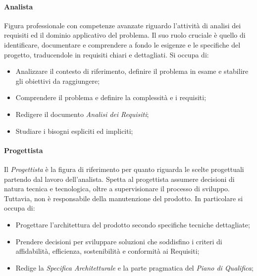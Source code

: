 \documentclass{article}
\begin{document}
        \paragraph{Analista}\label{analista}Figura professionale con competenze avanzate riguardo l'attività di analisi dei requisiti ed il dominio applicativo del problema. Il suo ruolo cruciale è quello di identificare, documentare e comprendere a fondo le esigenze e le specifiche del progetto, traducendole in requisiti chiari e dettagliati. Si occupa di:
        \begin{itemize}
            \item Analizzare il contesto di riferimento, definire il problema in esame e stabilire gli obiettivi da raggiungere;
            \item Comprendere il problema e definire la complessità e i requisiti;
            \item Redigere il documento \textit{Analisi dei Requisiti};
            \item Studiare i bisogni espliciti ed impliciti;
        \end{itemize} 
        \paragraph{Progettista}\label{progettista}Il \textit{Progettista} è la figura di riferimento per quanto riguarda le scelte progettuali partendo dal lavoro dell'analista. Spetta al progettista assumere decisioni di natura tecnica e tecnologica, oltre a supervisionare il processo di sviluppo. Tuttavia, non è responsabile della manutenzione del prodotto. In particolare si occupa di:
        \begin{itemize}
            \item Progettare l'architettura del prodotto secondo specifiche tecniche dettagliate;
            \item Prendere decisioni per sviluppare soluzioni che soddisfino i criteri di affidabilità, efficienza, sostenibilità e conformità ai Requisiti;
            \item Redige la \textit{Specifica Architetturale} e la parte pragmatica del \textit{Piano di Qualifica};
        \end{itemize} 
\end{document}
